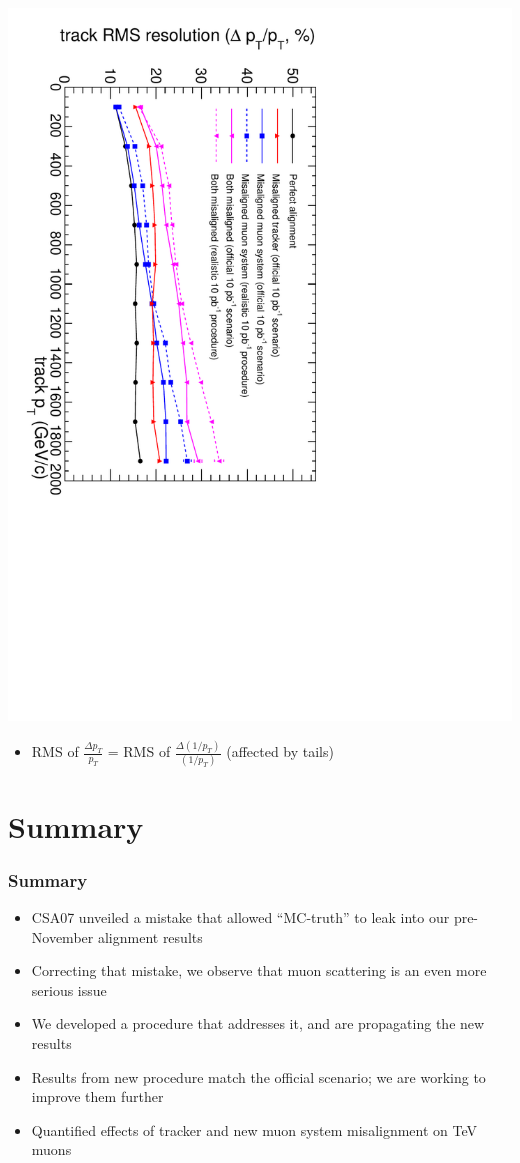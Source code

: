 \documentclass[compress]{beamer}
\begin{document}
\begin{frame}
\includegraphics[height=\linewidth, angle=90]{ZSSM_Align_TrackRes_color.pdf}
\begin{itemize}
\item RMS of $\displaystyle \frac{\Delta p_T}{p_T}$ = RMS of $\displaystyle \frac{\Delta (1/p_T)}{(1/p_T)}$ (affected by tails)
\end{itemize}
\end{frame}

\section*{Summary}

\begin{frame}
\frametitle{Summary}
\begin{itemize}\setlength{\itemsep}{0.4 cm}
\item CSA07 unveiled a mistake that allowed ``MC-truth'' to leak into
our pre-November alignment results
\item Correcting that mistake, we observe that muon scattering is an
even more serious issue
\item We developed a procedure that addresses it, and are propagating
the new results
\item Results from new procedure match the official scenario; we are
working to improve them further
\item Quantified effects of tracker and new muon system misalignment
on TeV muons
\end{itemize}

\label{numpages}
\end{frame}
\end{document}
